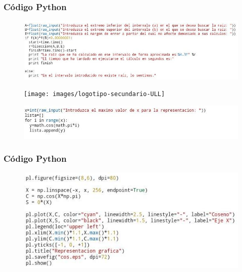 \documentclass{beamer}
\begin{document}
\begin{frame}
\frametitle{Código \textsf{Python}}

\begin{figure}[b]
\begin{center}
\includegraphics[scale=0.6]{python2.jpeg}
\end{center}
\end{figure}
\begin{figure}[b]\texttt{[image: images/logotipo-secundario-ULL]}\\[0.25cm]
\begin{center}
\includegraphics[scale=0.7]{python3.jpeg}
\end{center}
\end{figure}
\end{frame}

\begin{frame}
\frametitle{Código \textsf{Python}}

\begin{figure}[b]
\begin{center}
\includegraphics[scale=0.75]{python4.jpeg}
\end{center}
\end{figure}
\end{frame}
\end{document}
